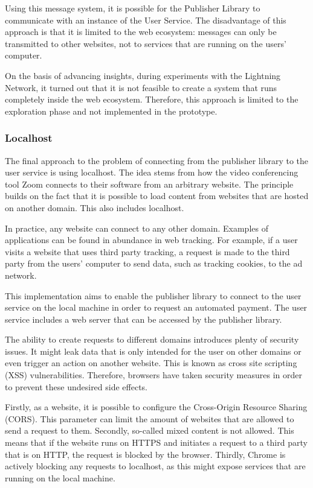 Using this message system, it is possible for the Publisher Library to communicate with an instance of the User Service. The disadvantage of this approach is that it is limited to the web ecosystem: messages can only be transmitted to other websites, not to services that are running on the users' computer. 

On the basis of advancing insights, during experiments with the Lightning Network, it turned out that it is not feasible to create a system that runs completely inside the web ecosystem. Therefore, this approach is limited to the exploration phase and not implemented in the prototype.

\subsubsection{Localhost}
\label{sec:localhost}

The final approach to the problem of connecting from the publisher library to the user service is using localhost. The idea stems from how the video conferencing tool Zoom connects to their software from an arbitrary website. The principle builds on the fact that it is possible to load content from websites that are hosted on another domain. This also includes localhost.

In practice, any website can connect to any other domain. Examples of applications can be found in abundance in web tracking. For example, if a user visits a website that uses third party tracking, a request is made to the third party from the users' computer to send data, such as tracking cookies, to the ad network. 

This implementation aims to enable the publisher library to connect to the user service on the local machine in order to request an automated payment. The user service includes a web server that can be accessed by the publisher library. 

The ability to create requests to different domains introduces plenty of security issues. It might leak data that is only intended for the user on other domains or even trigger an action on another website. This is known as cross site scripting (XSS) vulnerabilities. Therefore, browsers have taken security measures in order to prevent these undesired side effects.

Firstly, as a website, it is possible to configure the Cross-Origin Resource Sharing (CORS). This parameter can limit the amount of websites that are allowed to send a request to them. Secondly, so-called mixed content is not allowed. This means that if the website runs on HTTPS and initiates a request to a third party that is on HTTP, the request is blocked by the browser. Thirdly, Chrome is actively blocking any requests to localhost, as this might expose services that are running on the local machine.

